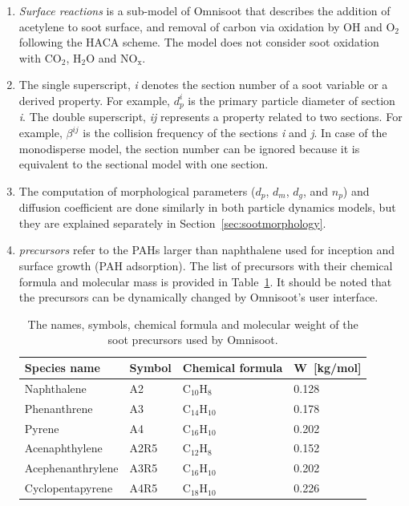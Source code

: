 \begin{enumerate}
\item \textit{Surface reactions} is a sub-model of Omnisoot that describes the addition of acetylene to soot surface, and removal of carbon via oxidation by OH and $\mathrm{O_2}$ following the HACA scheme. The model does not consider soot oxidation with $\mathrm{CO_2}$, $\mathrm{H_2O}$ and $\mathrm{NO_x}$.

\item The single superscript, \textit{i} denotes the section number of a soot variable or a derived property. For example, $d^i_p$ is the primary particle diameter of section \textit{i}. The double superscript, \textit{ij} represents a property related to two sections. For example, $\beta^{ij}$ is the collision frequency of the sections \textit{i} and \textit{j}.  In case of the monodisperse model, the section number can be ignored because it is equivalent to the sectional model with one section.

\item The computation of morphological parameters ($d_p$, $d_m$, $d_g$, and $n_p$) and diffusion coefficient are done similarly in both particle dynamics models, but they are explained separately in Section~\ref{sec:sootmorphology}.

\item \textit{precursors} refer to the PAHs larger than naphthalene used for inception and surface growth (PAH adsorption). The list of precursors with their chemical formula and molecular mass is provided in Table~\ref{tab:precursors_list}. It should be noted that the precursors can be dynamically changed by Omnisoot's user interface.

\begin{table}
	\caption{The names, symbols, chemical formula and molecular weight of the soot precursors used by Omnisoot.}
	\label{tab:precursors_list}
	\centering
	\begin{tabular}{l l l l}
		\hline
		Species name & Symbol & Chemical formula & W~[kg/mol] \\
		\hline
		Naphthalene       & A2   &  $\mathrm{C_{10}H_{8}}$   & 0.128 \\
		Phenanthrene      & A3   &  $\mathrm{C_{14}H_{10}}$  & 0.178 \\
		Pyrene            & A4   &  $\mathrm{C_{16}H_{10}}$  & 0.202 \\
		Acenaphthylene    & A2R5 &  $\mathrm{C_{12}H_{8}}$   & 0.152 \\
		Acephenanthrylene & A3R5 &  $\mathrm{C_{16}H_{10}}$  & 0.202 \\
		Cyclopentapyrene  & A4R5 &  $\mathrm{C_{18}H_{10}}$  & 0.226 \\
		\hline
	\end{tabular}
\end{table}

\end{enumerate}

